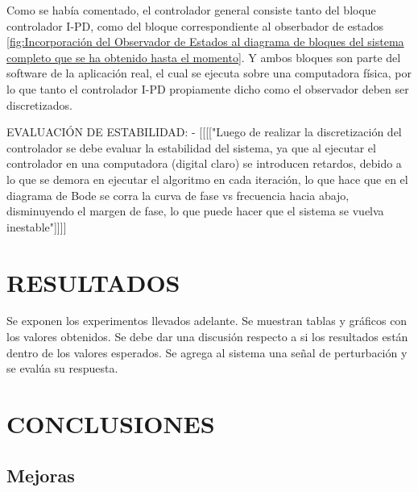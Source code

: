 \documentclass{article}
\begin{document}
\begin{sloppypar}
\hfill

Como se había comentado, el controlador general consiste tanto del bloque controlador I-PD, como del bloque correspondiente al obserbador de estados \ref{fig:Incorporación del Observador de Estados al diagrama de bloques del sistema completo que se ha obtenido hasta el momento}. Y ambos bloques son parte del software de la aplicación real, el cual se ejecuta sobre una computadora física, por lo que tanto el controlador I-PD propiamente dicho como el observador deben ser discretizados.








EVALUACIÓN DE ESTABILIDAD:
- [[[["Luego de realizar la discretización del controlador se debe evaluar la estabilidad del sistema, ya que al ejecutar el controlador en una computadora (digital claro) se introducen retardos, debido a lo que se demora en ejecutar el algoritmo en cada iteración, lo que hace que en el diagrama de Bode se corra la curva de fase vs frecuencia hacia abajo, disminuyendo el margen de fase, lo que puede hacer que el sistema se vuelva inestable"]]]]

\section{RESULTADOS}
\label{sec:RESULTADOS}

Se exponen los experimentos llevados adelante. Se muestran tablas y gráficos con los valores obtenidos. Se debe dar una discusión respecto a si los resultados están dentro de los valores esperados. Se agrega al sistema una señal de perturbación y se evalúa su respuesta.



\section{CONCLUSIONES}
\label{sec:CONCLUSIONES}


\subsection{Mejoras}
\label{sec:Mejoras}


\end{sloppypar}
\end{document}

